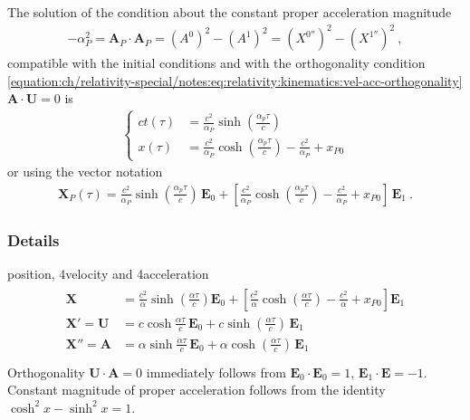 \documentclass[letterpaper,10pt,english]{jupyterBook}
\begin{document}
\sphinxAtStartPar
The solution of the condition about the constant proper acceleration magnitude
\begin{equation*}
\begin{split}-\alpha_P^2 = \mathbf{A}_P \cdot \mathbf{A}_P = \left( A^0 \right)^2 - \left( A^1 \right)^2 = \left( X^{0''} \right)^2 - \left( X^{1 ''} \right)^2 \ ,\end{split}
\end{equation*}
\sphinxAtStartPar
compatible with the initial conditions and with the orthogonality condition \eqref{equation:ch/relativity-special/notes:eq:relativity:kinematics:vel-acc-orthogonality} \(\mathbf{A} \cdot \mathbf{U} = 0\) is
\begin{equation*}
\begin{split}\left\{ \begin{aligned}
  c t(\tau) & = \frac{c^2}{\alpha_P} \sinh\left(\frac{\alpha_p \tau}{c}\right) \\
  x(\tau)   & = \frac{c^2}{\alpha_P} \cosh\left(\frac{\alpha_p \tau}{c}\right) - \frac{c^2}{\alpha_P} + x_{P0}
\end{aligned} \right.\end{split}
\end{equation*}
\sphinxAtStartPar
or using the vector notation
\begin{equation*}
\begin{split}
\mathbf{X}_P(\tau) = \frac{c^2}{\alpha_P} \sinh\left(\frac{\alpha_p \tau}{c}\right) \, \mathbf{E}_0 
+ \left[ \frac{c^2}{\alpha_P} \cosh\left(\frac{\alpha_p \tau}{c}\right) - \frac{c^2}{\alpha_P} + x_{P0} \right] \, \mathbf{E}_1 \ .
\end{split}
\end{equation*}\subsubsection*{Details}

\sphinxhyphen{}position, 4\sphinxhyphen{}velocity and 4\sphinxhyphen{}acceleration
\begin{equation*}
\begin{split}\begin{aligned}
  \mathbf{X} & = \frac{c^2}{\alpha} \sinh \left( \frac{\alpha \tau}{c} \right) \mathbf{E}_0 + \left[ \frac{c^2}{\alpha} \cosh \left( \frac{\alpha \tau}{c} \right) - \frac{c^2}{\alpha} + x_{P0} \right] \mathbf{E}_1 \\
  \mathbf{X}'  = \mathbf{U} & = c \cosh \frac{\alpha \tau}{c} \, \mathbf{E}_0 + c \sinh \left( \frac{\alpha \tau}{c} \right) \, \mathbf{E}_1 \\
  \mathbf{X}'' = \mathbf{A} & = \alpha \sinh \frac{\alpha \tau}{c} \, \mathbf{E}_0 + \alpha \cosh \left( \frac{\alpha \tau}{c} \right) \, \mathbf{E}_1 \\
\end{aligned}\end{split}
\end{equation*}
\sphinxAtStartPar
Orthogonality \(\mathbf{U} \cdot \mathbf{A} = 0\) immediately follows from \(\mathbf{E}_0 \cdot \mathbf{E}_0 = 1\), \(\mathbf{E}_1 \cdot \mathbf{E} = -1\). Constant magnitude of proper acceleration follows from the identity \(\cosh^2 x - \sinh^2 x = 1\).
\end{document}
